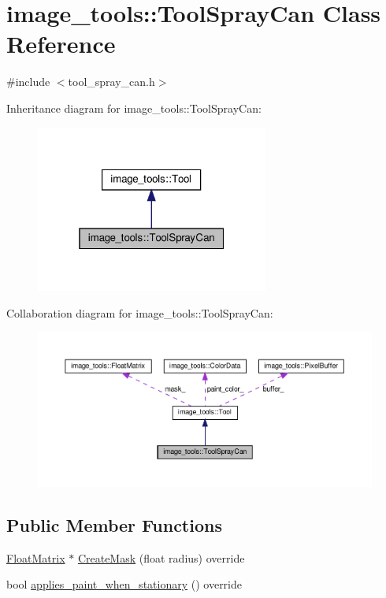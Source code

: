 \hypertarget{classimage__tools_1_1ToolSprayCan}{}\section{image\+\_\+tools\+:\+:Tool\+Spray\+Can Class Reference}
\label{classimage__tools_1_1ToolSprayCan}


{\ttfamily \#include $<$tool\+\_\+spray\+\_\+can.\+h$>$}



Inheritance diagram for image\+\_\+tools\+:\+:Tool\+Spray\+Can\+:
\nopagebreak
\begin{figure}[H]
\begin{center}
\leavevmode
\includegraphics[width=217pt]{classimage__tools_1_1ToolSprayCan__inherit__graph}
\end{center}
\end{figure}


Collaboration diagram for image\+\_\+tools\+:\+:Tool\+Spray\+Can\+:
\nopagebreak
\begin{figure}[H]
\begin{center}
\leavevmode
\includegraphics[width=350pt]{classimage__tools_1_1ToolSprayCan__coll__graph}
\end{center}
\end{figure}
\subsection*{Public Member Functions}
\begin{DoxyCompactItemize}
\item 
\hyperlink{classimage__tools_1_1FloatMatrix}{Float\+Matrix} $\ast$ \hyperlink{classimage__tools_1_1ToolSprayCan_acac77013717667f64c9ffaedf621b553}{Create\+Mask} (float radius) override
\item 
bool \hyperlink{classimage__tools_1_1ToolSprayCan_acd1e7907873ef757f200bf669d8dbfd9}{applies\+\_\+paint\+\_\+when\+\_\+stationary} () override
\end{DoxyCompactItemize}
